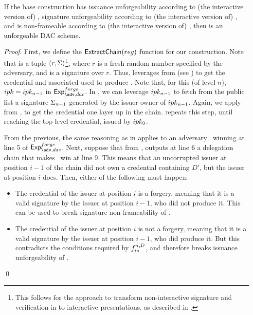\begin{theorem}
  If the base \CUASGenInt construction has issuance unforgeability according to
  (the interactive version of) , signature
  unforgeability according to (the interactive version of)
  , and is non-frameable according to (the
  interactive version of) , then \CUASDAC is an
  unforgeable DAC scheme.
\end{theorem}

\begin{proof}
  First, we define the $\mathsf{ExtractChain}(reg)$ function for our
  construction. Note that \utrans is a tuple $(r,\Sigma)$\footnote{This follows
    for the approach
    to transform non-interactive signature and verification in \UAS to
    interactive presentations, as described in .}, where
  $r$ is a fresh random number specified by the adversary, and \Sig is a
  \CUASGen signature over $r$. Thus,  leverages
  \ExtractSign from \CUASGen (see ) to get the
  credential and associated \ipk used to produce \Sig. Note that, for this
  \ipk (of level $n$), $ipk = ipk_{n-1}$ in $\Exp^{forge}_{\adv,dac}$. In
  \CUASDAC, we can leverage $ipk_{n-1}$ to fetch from the public list a
  signature $\Sigma_{n-1}$ generated by the issuer owner of $ipk_{n-1}$. Again,
  we apply \ExtractSign from \CUASGen, to get the credential one layer up in the
  chain.  repeats this step, until reaching the top level
  credential, issued by $ipk_0$.

  From the previous, the same reasoning as in  applies
  to an adversary \adv~winning at line 5 of $\Exp^{forge}_{\adv,dac}$. Next,
  suppose that from \utrans,  outputs at line 6 a
  delegation chain that makes \adv~win at line 9. This means that an
  uncorrupted issuer at position $i-1$ of the chain did not own a credential
  containing $D'$, but the issuer at position $i$ does. Then, either of the
  following must happen:

  \begin{itemize}
  \item The credential of the issuer at position $i$ is a forgery, meaning that
    it is a valid signature by the issuer at position $i-1$, who did not produce
    it. This can be used to break signature non-frameability of \CUASGenInt.
  \item The credential of the issuer at position $i$ is not a forgery, meaning
    that it is a valid signature by the issuer at position $i-1$, who did
    produce it. But this contradicts the conditions required by $f_{is}^{n,D}$,
    and therefore breaks issuance unforgeability of \CUASGenInt.
  \end{itemize}
  \qed
\end{proof}

